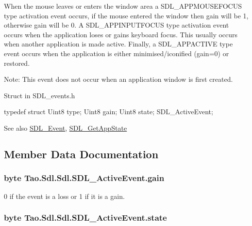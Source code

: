 When the mouse leaves or enters the window area a SDL\_\-APPMOUSEFOCUS type activation event occurs, if the mouse entered the window then gain will be 1, otherwise gain will be 0. A SDL\_\-APPINPUTFOCUS type activation event occurs when the application loses or gains keyboard focus. This usually occurs when another application is made active. Finally, a SDL\_\-APPACTIVE type event occurs when the application is either minimised/iconified (gain=0) or restored. 

Note: This event does not occur when an application window is first created. 

Struct in SDL\_\-events.h 
\begin{DoxyCode}
            typedef struct{
            Uint8 type;
            Uint8 gain;
            Uint8 state;
            } SDL_ActiveEvent;
\end{DoxyCode}


\begin{DoxySeeAlso}{See also}
\hyperlink{struct_tao_1_1_sdl_1_1_s_d_l___event}{SDL\_\-Event}, \hyperlink{_sdl_8cs_a09dacf1e51fd361c9ddbddf72848ac18}{SDL\_\-GetAppState}


\end{DoxySeeAlso}


\subsection{Member Data Documentation}
\hypertarget{struct_tao_1_1_sdl_1_1_sdl_1_1_s_d_l___active_event_a3bcc9961225a5da23402981050d980b7}{
\subsubsection[{gain}]{\setlength{\rightskip}{0pt plus 5cm}byte {\bf Tao.Sdl.Sdl.SDL\_\-ActiveEvent.gain}}}
\label{struct_tao_1_1_sdl_1_1_sdl_1_1_s_d_l___active_event_a3bcc9961225a5da23402981050d980b7}


0 if the event is a loss or 1 if it is a gain. 

\hypertarget{struct_tao_1_1_sdl_1_1_sdl_1_1_s_d_l___active_event_a7f667864c62204bef0a17717adf15600}{
\subsubsection[{state}]{\setlength{\rightskip}{0pt plus 5cm}byte {\bf Tao.Sdl.Sdl.SDL\_\-ActiveEvent.state}}}
\label{struct_tao_1_1_sdl_1_1_sdl_1_1_s_d_l___active_event_a7f667864c62204bef0a17717adf15600}


